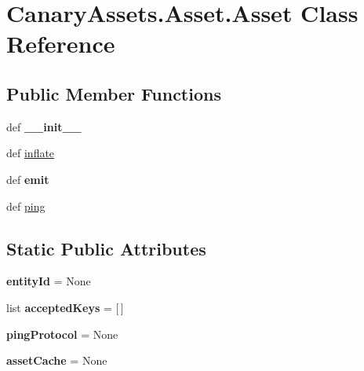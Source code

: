 \hypertarget{class_canary_assets_1_1_asset_1_1_asset}{\section{Canary\-Assets.\-Asset.\-Asset Class Reference}
\label{class_canary_assets_1_1_asset_1_1_asset}
}
\subsection*{Public Member Functions}
\begin{DoxyCompactItemize}
\item 
\hypertarget{class_canary_assets_1_1_asset_1_1_asset_a86ac77042148b8490907c19e59585002}{def {\bfseries \-\_\-\-\_\-init\-\_\-\-\_\-}}\label{class_canary_assets_1_1_asset_1_1_asset_a86ac77042148b8490907c19e59585002}

\item 
def \hyperlink{class_canary_assets_1_1_asset_1_1_asset_a9b0b6f19f09d50dea75071e5c5af494b}{inflate}
\item 
\hypertarget{class_canary_assets_1_1_asset_1_1_asset_acf5d55e86c096f3319b4265d93e0f1c8}{def {\bfseries emit}}\label{class_canary_assets_1_1_asset_1_1_asset_acf5d55e86c096f3319b4265d93e0f1c8}

\item 
def \hyperlink{class_canary_assets_1_1_asset_1_1_asset_ab5655ab09219eb41b0f4b757f3cc339a}{ping}
\end{DoxyCompactItemize}
\subsection*{Static Public Attributes}
\begin{DoxyCompactItemize}
\item 
\hypertarget{class_canary_assets_1_1_asset_1_1_asset_afb1b09475cec8a2a41237a0678d5ec38}{{\bfseries entity\-Id} = None}\label{class_canary_assets_1_1_asset_1_1_asset_afb1b09475cec8a2a41237a0678d5ec38}

\item 
\hypertarget{class_canary_assets_1_1_asset_1_1_asset_ad262abea1621878cbd0b397f0d54356b}{list {\bfseries accepted\-Keys} = \mbox{[}$\,$\mbox{]}}\label{class_canary_assets_1_1_asset_1_1_asset_ad262abea1621878cbd0b397f0d54356b}

\item 
\hypertarget{class_canary_assets_1_1_asset_1_1_asset_ab425107a364d89337e3545ab54a6fc62}{{\bfseries ping\-Protocol} = None}\label{class_canary_assets_1_1_asset_1_1_asset_ab425107a364d89337e3545ab54a6fc62}

\item 
\hypertarget{class_canary_assets_1_1_asset_1_1_asset_adcf0c454cc4aa16688a264d447db6b74}{{\bfseries asset\-Cache} = None}\label{class_canary_assets_1_1_asset_1_1_asset_adcf0c454cc4aa16688a264d447db6b74}

\end{DoxyCompactItemize}


